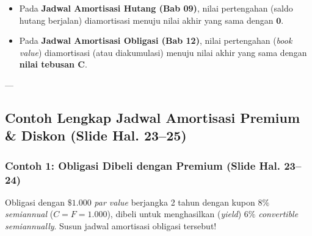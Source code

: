 \documentclass[11pt,a4paper]{article}
\begin{document}
\begin{notebox}
\begin{itemize}
    \item Pada \textbf{Jadwal Amortisasi Hutang (Bab 09)}, nilai pertengahan (saldo hutang berjalan) diamortisasi menuju nilai akhir yang sama dengan $\mathbf{0}$.
    \item Pada \textbf{Jadwal Amortisasi Obligasi (Bab 12)}, nilai pertengahan (\textit{book value}) diamortisasi (atau diakumulasi) menuju nilai akhir yang sama dengan \textbf{nilai tebusan $\mathbf{C}$}.
\end{itemize}
\end{notebox}

---

\subsection{Contoh Lengkap Jadwal Amortisasi Premium \& Diskon (Slide Hal. 23--25)}

\subsubsection{Contoh 1: Obligasi Dibeli dengan Premium (Slide Hal. 23--24)}

\begin{examplebox}
Obligasi dengan $\$1.000$ \textit{par value} berjangka 2 tahun dengan kupon $8\%$ \textit{semiannual} ($C = F = 1.000$), dibeli untuk menghasilkan (\textit{yield}) $6\%$ \textit{convertible semiannually}. Susun jadwal amortisasi obligasi tersebut!
\end{examplebox}
\end{document}
